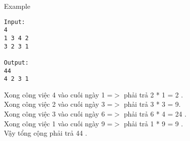 Example
\begin{verbatim}
Input:
4
1 3 4 2
3 2 3 1

Output:
44
4 2 3 1 

\end{verbatim}

Xong công việc 4 vào cuối ngày 1 =$>$ phải trả 2 * 1 = 2 .
\\Xong công việc 2 vào cuối ngày 3 =$>$ phải trả 3 * 3 = 9.
\\Xong công việc 3 vào cuối ngày 6 =$>$ phải trả 6 * 4 = 24 .
\\Xong công việc 1 vào cuối ngày 9 =$>$ phải trả 1 * 9 = 9 .
\\Vậy tổng cộng phải trả 44 .